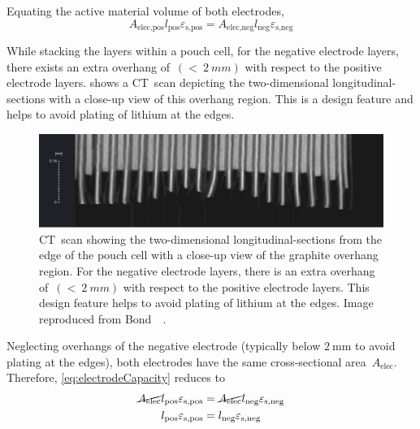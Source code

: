 Equating  the active material volume of both electrodes,
\begin{equation}
    A_\text{elec,pos}l_\text{pos}  \varepsilon_\text{s,pos} = A_\text{elec,neg}l_\text{neg}  \varepsilon_\text{s,neg} \label{eq:electrodeCapacity}
\end{equation}

While  stacking the  layers  within a  pouch cell,  for  the negative  electrode
layers, there exists  an extra overhang of~${(<~\SI{2}{mm})}$ with  respect to the
positive  electrode layers.    shows a  CT~scan
depicting the two-dimensional longitudinal-sections with a close-up view of this
overhang region. This is a design feature  and helps to avoid plating of lithium
at the edges.

\begin{figure}[!htbp]
    \centering
    \includegraphics{chapters/layer_opt/figures/overhang}
    \caption[Stacking of layers within a pouch cell showing overhang of negative
    electrode]
    {CT~scan showing the two-dimensional longitudinal-sections from the edge of
        the pouch cell with a close-up view of the graphite overhang region. For
        the negative electrode layers, there is an extra overhang of~${(<~\SI{2}{mm})}$ with respect to the positive electrode layers. This
        design feature helps to avoid plating of lithium at the edges. Image
    reproduced from Bond~\etal~\cite{Bond2017}.}
    \label{fig:anodeoverhangpouchcell}
\end{figure}

Neglecting   overhangs    of   the    negative   electrode    (typically   below
$\SI{2}{\milli\meter}$    to    avoid    plating    at    the    edges),    both
electrodes  have  the   same  cross-sectional  area~$A_\text{elec}$.  Therefore,
\cref{eq:electrodeCapacity} reduces to
\begin{align}
    \cancel{A_\text{elec}}l_\text{pos}  \varepsilon_\text{s,pos} & = \cancel{A_\text{elec}}l_\text{neg}  \varepsilon_\text{s,neg}  \\
    l_\text{pos}  \varepsilon_\text{s,pos}                       & = l_\text{neg}  \varepsilon_\text{s,neg}\label{eq:electrodeCapequalarea}
\end{align}

